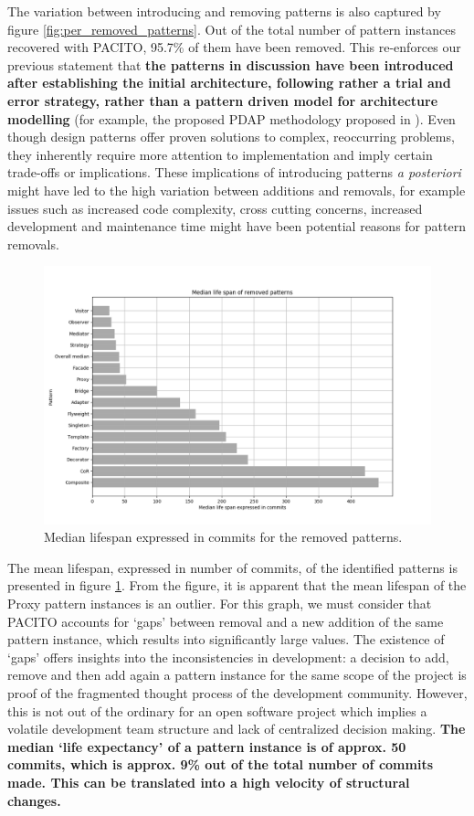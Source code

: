 The variation between introducing and removing patterns is also captured by figure \ref{fig:per_removed_patterns}. Out of the total number of pattern instances recovered with PACITO, 95.7\% of them have been removed. This re-enforces our previous statement that \textbf{the patterns in discussion have been introduced after establishing the initial architecture, following rather a trial and error strategy, rather than a pattern driven model for architecture modelling} (for example, the proposed PDAP methodology proposed in \cite{pdap}). Even though design patterns offer proven solutions to complex, reoccurring problems, they inherently require more attention to implementation and imply certain trade-offs or implications. These implications of introducing patterns \textit{a posteriori} might have led to the high variation between additions and removals, for example issues such as increased code complexity, cross cutting concerns, increased development and maintenance time might have been potential reasons for pattern removals.

\begin{figure}[H]
    \centering
    \includegraphics[width =  \textwidth]{images/graphs/mean_life.png}
    \caption{Median lifespan expressed in commits for the removed patterns.}
    \label{fig:mean_life}
\end{figure}

The mean lifespan, expressed in number of commits, of the identified patterns is presented in figure \ref{fig:mean_life}. From the figure, it is apparent that the mean lifespan of the Proxy pattern instances is an outlier. For this graph, we must consider that PACITO  accounts for `gaps' between removal and a new addition of the same pattern instance, which results into significantly large values. The existence of `gaps' offers insights into the inconsistencies in development: a decision to add, remove and then add again a pattern instance for the same scope of the project is proof of the fragmented thought process of the development community. However, this is not out of the ordinary for an open software project which implies a volatile development team structure and lack of centralized decision making. \textbf{The median `life expectancy' of a pattern instance is of approx. 50 commits, which is approx. 9\% out of the total number of commits made. This can be translated into a high velocity of structural changes.}

